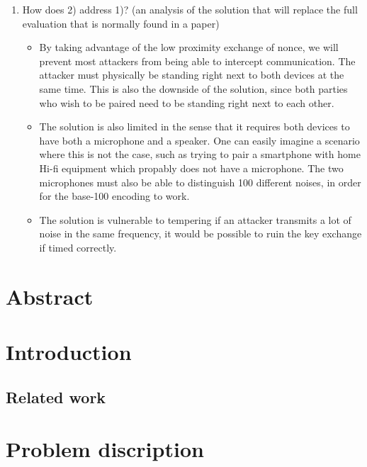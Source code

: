 \documentclass[12pt]{article}
\begin{document}
\begin{enumerate}
    \item How does 2) address 1)?  (an analysis of the solution that will replace the full evaluation that is normally found in a paper)

    \begin{itemize}
        \item By taking advantage of the low proximity exchange of nonce, we will prevent most attackers from being able to intercept communication. The attacker must physically be standing right next to both devices at the same time.
        This is also the downside of the solution, since both parties who wish to be paired need to be standing right next to each other.
        \item The solution is also limited in the sense that it requires both devices to have both a microphone and a speaker. One can easily imagine a scenario where this is not the case, such as trying to pair a smartphone with home Hi-fi equipment which propably does not have a microphone. The two microphones must also be able to distinguish 100 different noises, in order for the base-100 encoding to work.
        \item The solution is vulnerable to tempering if an attacker transmits a lot of noise in the same frequency, it would be possible to ruin the key exchange if timed correctly.
    \end{itemize}

\end{enumerate}

\newpage

\section{Abstract}
\label{sec:Abstract}

\newpage

\section{Introduction}
\label{sec:Introduction}

\subsection{Related work}
\label{sub:Related work}


\newpage

\section{Problem discription}
\label{sec:Problem}
\end{document}
